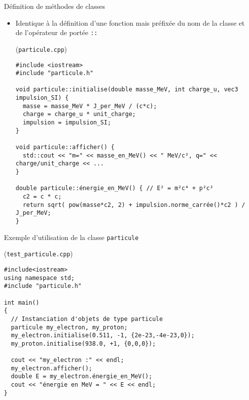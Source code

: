 \documentclass[c]{beamer}
\begin{document}
\begin{frame}[fragile,label={sec:orgheadline5}]{Définition de méthodes de classes}
 \begin{itemize}
\item Identique à la définition d'une fonction mais préfixée du nom de la classe et
de l'opérateur de portée \texttt{::}
\begin{cbox}[][lwuc](\texttt{particule.cpp})
\begin{verbatim}
#include <iostream>
#include "particule.h"

void particule::initialise(double masse_MeV, int charge_u, vec3 impulsion_SI) {
  masse = masse_MeV * J_per_MeV / (c*c);
  charge = charge_u * unit_charge;
  impulsion = impulsion_SI;
}

void particule::afficher() {
  std::cout << "m=" << masse_en_MeV() << " MeV/c², q=" << charge/unit_charge << ...
}

double particule::énergie_en_MeV() { // E² = m²c⁴ + p²c²
  c2 = c * c;
  return sqrt( pow(masse*c2, 2) + impulsion.norme_carrée()*c2 ) / J_per_MeV;
}
\end{verbatim}
\end{cbox}
\end{itemize}
\end{frame}


\begin{frame}[fragile,label={sec:orgheadline6}]{Exemple d'utilisation de la classe \texttt{particule}}
\begin{cbox}[][lwuc](\texttt{test\_particule.cpp})
\begin{verbatim}
#include<iostream>
using namespace std;
#include "particule.h"

int main()
{
  // Instanciation d'objets de type particule
  particule my_electron, my_proton;
  my_electron.initialise(0.511, -1, {2e-23,-4e-23,0});
  my_proton.initialise(938.0, +1, {0,0,0});

  cout << "my_electron :" << endl;
  my_electron.afficher();
  double E = my_electron.énergie_en_MeV();
  cout << "énergie en MeV = " << E << endl;
}
\end{verbatim}
\end{cbox}
\end{frame}
\end{document}
